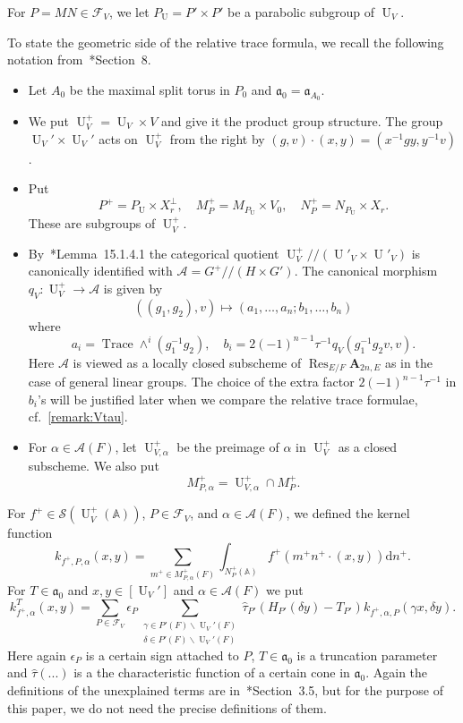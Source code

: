 \documentclass[letterpaper,11pt]{amsart}
\newcommand{\fa}{\mathfrak{a}}
\newcommand{\bA}{\mathbb{A}}
\newcommand{\cA}{\mathcal{A}}
\newcommand{\cF}{\mathcal{F}}
\newcommand{\cS}{\mathcal{S}}
\newcommand{\rd}{\mathrm{d}}
\newcommand{\<}{\negthickspace}
\DeclareMathOperator{\Trace}{Trace}
\DeclareMathOperator{\U}{U}
\DeclareMathOperator{\Res}{Res}
\theoremstyle{definition}
\theoremstyle{plain}
\theoremstyle{remark}
\numberwithin{equation}{section}
\begin{document}
For $P = MN \in \cF_V$, we let $P_{\mathrm{\U}} = P' \times P'$ be a parabolic subgroup of $\U_V$. 

To state the geometric side of the relative trace formula, we recall the following notation from~\cite{BLX1}*{Section~8}.

\begin{itemize}
\item Let $A_0$ be the maximal split torus in $P_0$ and $\fa_0 = \fa_{A_0}$.

\item We put $\U_V^+ = \U_V \times V$ and give it the product group structure. 
    The group $\U_V' \times \U_V'$
    acts on $\U_V^+$ from the right by $(g, v) \cdot (x, y) = (x^{-1} g y, y^{-1} v)$.

\item  Put 
        \[
        P^+ = P_{\U} \times X_r^{\perp}, \quad
        M_P^+ = M_{P_{\U}} \times V_0, \quad
        N_P^+ = N_{P_{\U}} \times X_r .
        \]
These are subgroups of $\U_V^+$.


\item By~\cite{CZ}*{Lemma~15.1.4.1} the categorical quotient $\U_V^+//(\U'_V \times \U'_V)$ is canonically identified with $\cA = G^+//(H \times G')$. The canonical morphism $q_V: \U_V^+ \to \cA$ is given by
        \[
        ((g_1, g_2), v) \mapsto (a_1, \hdots, a_n; b_1, \hdots, b_n)
        \]
    where
        \[
        a_i = \Trace \wedge^i (g_1^{-1} g_2), \quad
        b_i = 2 (-1)^{n-1} \tau^{-1} q_V( g_1^{-1} g_2 v, v).
        \]
    Here $\cA$ is viewed as a locally closed subscheme of $\Res_{E/F} \mathbf{A}_{2n, E}$ as in the case of general linear groups. The choice of the extra factor $2 (-1)^{n-1} \tau^{-1}$ in
$b_i$'s will be justified later when we compare the relative trace formulae, cf.~\ref{remark:Vtau}.

\item For $\alpha \in \cA(F)$, let $\U^+_{V, \alpha}$ be the preimage of $\alpha$ in
    $\U^+_V$ as a closed subscheme. We also put
        \[
        M^+_{P, \alpha} = \U^+_{V, \alpha} \cap M^+_P.
        \]
\end{itemize}

For $f^+ \in \cS(\U_V^+(\bA))$, $P \in \cF_V$, and $\alpha \in \cA(F)$, we defined the kernel function
    \[
    k_{f^+,P,\alpha}(x,y) = \sum_{m^+ \in M_{P,\alpha}^{+}(F)}
    \int_{N_P^+(\bA)} f^+(m^+ n^+ \cdot (x,y)) \rd n^+.
    \]
For $T \in \fa_0$ and $x, y \in [\U_V']$ and $\alpha \in \cA(F)$ we put
    \[
     k_{f^+,\alpha}^T(x,y) =
    \sum_{P \in \cF_V} \epsilon_P
    \sum_{\substack{\gamma \in P'(F) \backslash \U_V'(F)
    \\
    \delta \in P'(F) \backslash \U_V'(F)}}
    \widehat{\tau}_{P'}(H_{P'}(\delta y)-T_{P'})
    k_{f^+, \alpha, P}(\gamma x, \delta y).
    \]
Here again $\epsilon_P$ is a certain sign attached to $P$, $T \in \fa_{0}$ is a truncation parameter and $\widehat{\tau}(...)$ is a the characteristic function of a certain cone in $\fa_{0}$. Again the definitions of the unexplained terms are in~\cite{BLX1}*{Section~3.5}, but for the purpose of this paper, we do not need the precise definitions of them.
\end{document}
